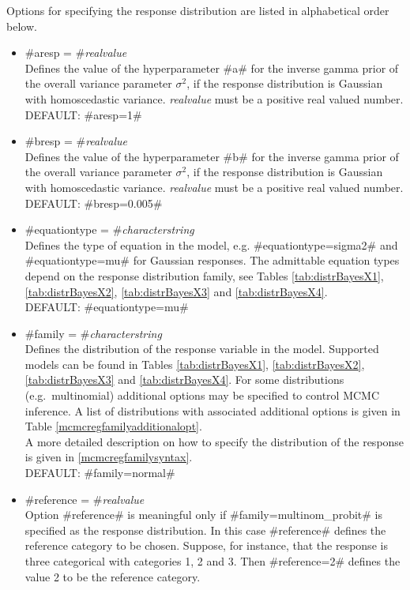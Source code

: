 Options for specifying the response distribution are listed in
alphabetical order below.


\begin{itemize}
\item #aresp = #{\em realvalue } \\
Defines the value of the hyperparameter #a# for the inverse gamma
prior of the overall variance parameter $\sigma^2$, if the
response distribution is Gaussian with homoscedastic variance.
{\em realvalue} must be a positive real valued number. \\
DEFAULT: #aresp=1#

\item #bresp = #{\em realvalue } \\
Defines the value of the hyperparameter #b# for the inverse gamma
prior of the overall variance parameter $\sigma^2$, if the
response distribution is Gaussian with homoscedastic variance.
{\em realvalue} must be a positive real valued number. \\
DEFAULT: #bresp=0.005#
\item #equationtype = #{\em characterstring} \\
Defines the type of equation in the model, e.g. #equationtype=sigma2# and
 #equationtype=mu# for Gaussian responses. The admittable equation types depend on the response
 distribution family, see Tables \ref{tab:distrBayesX1}, \ref{tab:distrBayesX2}, \ref{tab:distrBayesX3}
and \ref{tab:distrBayesX4}. \\
DEFAULT: #equationtype=mu#
 \item #family = #{\em characterstring } \\
Defines the distribution of the response variable in the model.
Supported models can be found in Tables \ref{tab:distrBayesX1}, \ref{tab:distrBayesX2}, \ref{tab:distrBayesX3}
and \ref{tab:distrBayesX4}.
For some distributions
(e.g.~multinomial) additional options may be specified to control
MCMC inference.
A list of distributions with associated additional options is given in Table \ref{mcmcregfamilyadditionalopt}.  \\
A more detailed description on how to specify the
distribution of the response is given in \autoref{mcmcregfamilysyntax}. \\
DEFAULT: #family=normal#

\item #reference = #{\em realvalue} \\
Option #reference# is meaningful only if #family=multinom_probit# is
specified as the response distribution. In this case #reference#
defines the reference category to be chosen. Suppose, for
instance, that the response is three categorical with categories
1, 2 and 3. Then #reference=2# defines the value 2 to be the
reference category.
\end{itemize}

